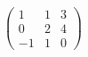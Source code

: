 \documentclass{article}%
\begin{document}
%
\pagestyle{empty}%
\LARGE%
$\begin{pmatrix} 1 & 1 & 3 \\ 0 & 2 & 4 \\ -1 & 1 & 0  \end{pmatrix}$%
\end{document}
